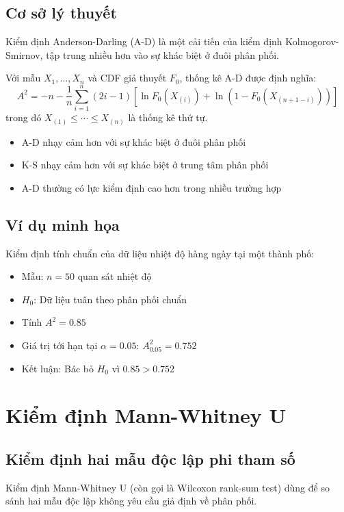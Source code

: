 \subsection{Cơ sở lý thuyết}
Kiểm định Anderson-Darling (A-D) là một cải tiến của kiểm định Kolmogorov-Smirnov, tập trung nhiều hơn vào sự khác biệt ở đuôi phân phối.

\begin{dn}
Với mẫu $X_1, \ldots, X_n$ và CDF giả thuyết $F_0$, thống kê A-D được định nghĩa:
\[
A^2 = -n - \frac{1}{n}\sum_{i=1}^n (2i-1)[\ln F_0(X_{(i)}) + \ln(1-F_0(X_{(n+1-i)}))]
\]
trong đó $X_{(1)} \leq \cdots \leq X_{(n)}$ là thống kê thứ tự.
\end{dn}

\begin{tinhchat}
\begin{itemize}
    \item A-D nhạy cảm hơn với sự khác biệt ở đuôi phân phối
    \item K-S nhạy cảm hơn với sự khác biệt ở trung tâm phân phối
    \item A-D thường có lực kiểm định cao hơn trong nhiều trường hợp
\end{itemize}
\end{tinhchat}

\subsection{Ví dụ minh họa}
Kiểm định tính chuẩn của dữ liệu nhiệt độ hàng ngày tại một thành phố:
\begin{itemize}
    \item Mẫu: $n = 50$ quan sát nhiệt độ
    \item $H_0$: Dữ liệu tuân theo phân phối chuẩn
    \item Tính $A^2 = 0.85$
    \item Giá trị tới hạn tại $\alpha = 0.05$: $A^2_{0.05} = 0.752$
    \item Kết luận: Bác bỏ $H_0$ vì $0.85 > 0.752$
\end{itemize}

\section{Kiểm định Mann-Whitney U}

\subsection{Kiểm định hai mẫu độc lập phi tham số}
Kiểm định Mann-Whitney U (còn gọi là Wilcoxon rank-sum test) dùng để so sánh hai mẫu độc lập không yêu cầu giả định về phân phối.


